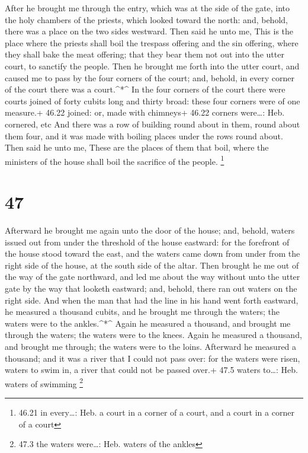  After he brought me through the entry, which was at the
side of the gate, into the holy chambers of the priests, which looked
toward the north: and, behold, there was a place on the two sides
westward.  Then said he unto me, This is the place where
the priests shall boil the trespass offering and the sin offering, where
they shall bake the meat offering; that they bear them not out into the
utter court, to sanctify the people.  Then he brought me
forth into the utter court, and caused me to pass by the four corners of
the court; and, behold, in every corner of the court there was a
court.\^{}*\^{}  In the four corners of the court there
were courts joined of forty cubits long and thirty broad: these four
corners were of one measure.+ 46.22 joined: or, made with chimneys+
46.22 corners were\ldots: Heb. cornered, etc  And there was
a row of building round about in them, round about them four, and it was
made with boiling places under the rows round about.  Then
said he unto me, These are the places of them that boil, where the
ministers of the house shall boil the sacrifice of the people.
\footnote{46.21 in every\ldots: Heb. a court in a corner of a court, and
  a court in a corner of a court}

\hypertarget{section-46}{%
\section{47}\label{section-46}}

 Afterward he brought me again unto the door of the house;
and, behold, waters issued out from under the threshold of the house
eastward: for the forefront of the house stood toward the east, and the
waters came down from under from the right side of the house, at the
south side of the altar.  Then brought he me out of the way
of the gate northward, and led me about the way without unto the utter
gate by the way that looketh eastward; and, behold, there ran out waters
on the right side.  And when the man that had the line in
his hand went forth eastward, he measured a thousand cubits, and he
brought me through the waters; the waters were to the ankles.\^{}*\^{}
 Again he measured a thousand, and brought me through the
waters; the waters were to the knees. Again he measured a thousand, and
brought me through; the waters were to the loins.  Afterward
he measured a thousand; and it was a river that I could not pass over:
for the waters were risen, waters to swim in, a river that could not be
passed over.+ 47.5 waters to\ldots: Heb. waters of swimming \footnote{47.3
  the waters were\ldots: Heb. waters of the ankles}

